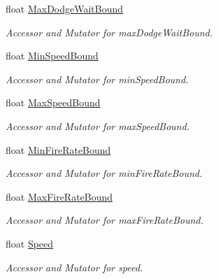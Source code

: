 \begin{DoxyCompactItemize}
float \mbox{\hyperlink{class_individual_a22ae950e01ef3055dd3cd15972e51770}{Max\+Dodge\+Wait\+Bound}}
\begin{DoxyCompactList}\small\item\em Accessor and Mutator for max\+Dodge\+Wait\+Bound. \end{DoxyCompactList}\item 
float \mbox{\hyperlink{class_individual_a78a3431b66eef67e58b6f4da5e1c8d63}{Min\+Speed\+Bound}}
\begin{DoxyCompactList}\small\item\em Accessor and Mutator for min\+Speed\+Bound. \end{DoxyCompactList}\item 
float \mbox{\hyperlink{class_individual_abad1b2b85eb811524940ea456452c550}{Max\+Speed\+Bound}}
\begin{DoxyCompactList}\small\item\em Accessor and Mutator for max\+Speed\+Bound. \end{DoxyCompactList}\item 
float \mbox{\hyperlink{class_individual_a45bb7b475e4b2537cdf888b9e1b13144}{Min\+Fire\+Rate\+Bound}}
\begin{DoxyCompactList}\small\item\em Accessor and Mutator for min\+Fire\+Rate\+Bound. \end{DoxyCompactList}\item 
float \mbox{\hyperlink{class_individual_a1096694f11f7b9e729aeabbfe7097eaf}{Max\+Fire\+Rate\+Bound}}
\begin{DoxyCompactList}\small\item\em Accessor and Mutator for max\+Fire\+Rate\+Bound. \end{DoxyCompactList}\item 
float \mbox{\hyperlink{class_individual_a02b01142acd16f32fd2faf1864b3627f}{Speed}}
\begin{DoxyCompactList}\small\item\em Accessor and Mutator for speed. \end{DoxyCompactList}\item 

\end{DoxyCompactItemize}
